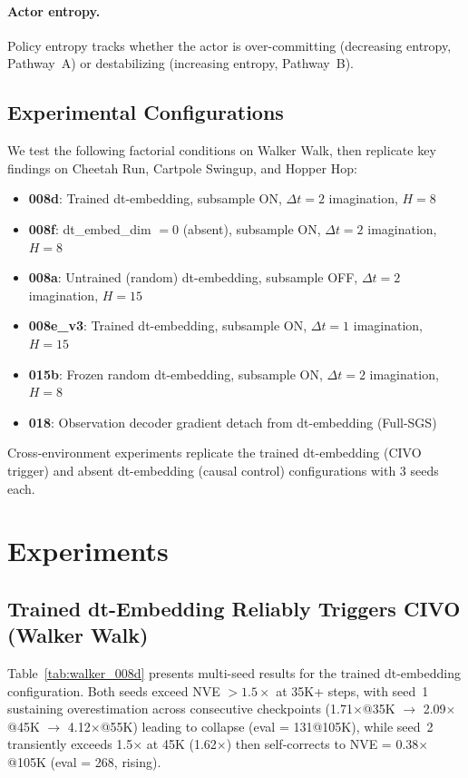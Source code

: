 \documentclass[10pt,letterpaper]{article}
\begin{document}
\paragraph{Actor entropy.}
Policy entropy tracks whether the actor is over-committing (decreasing entropy, Pathway~A) or destabilizing (increasing entropy, Pathway~B).

\subsection{Experimental Configurations}

We test the following factorial conditions on Walker Walk, then replicate key findings on Cheetah Run, Cartpole Swingup, and Hopper Hop:

\begin{itemize}[nosep]
\item \textbf{008d}: Trained dt-embedding, subsample ON, $\Delta t = 2$ imagination, $H = 8$
\item \textbf{008f}: dt\_embed\_dim $= 0$ (absent), subsample ON, $\Delta t = 2$ imagination, $H = 8$
\item \textbf{008a}: Untrained (random) dt-embedding, subsample OFF, $\Delta t = 2$ imagination, $H = 15$
\item \textbf{008e\_v3}: Trained dt-embedding, subsample ON, $\Delta t = 1$ imagination, $H = 15$
\item \textbf{015b}: Frozen random dt-embedding, subsample ON, $\Delta t = 2$ imagination, $H = 8$
\item \textbf{018}: Observation decoder gradient detach from dt-embedding (Full-SGS)
\end{itemize}

Cross-environment experiments replicate the trained dt-embedding (CIVO trigger) and absent dt-embedding (causal control) configurations with 3 seeds each.

\section{Experiments}

\subsection{Trained dt-Embedding Reliably Triggers CIVO (Walker Walk)}
\label{sec:walker_civo}

Table~\ref{tab:walker_008d} presents multi-seed results for the trained dt-embedding configuration. Both seeds exceed NVE $> 1.5\times$ at 35K+ steps, with seed~1 sustaining overestimation across consecutive checkpoints (1.71$\times$@35K $\to$ 2.09$\times$@45K $\to$ 4.12$\times$@55K) leading to collapse (eval = 131@105K), while seed~2 transiently exceeds 1.5$\times$ at 45K (1.62$\times$) then self-corrects to NVE = 0.38$\times$@105K (eval = 268, rising).
\end{document}
